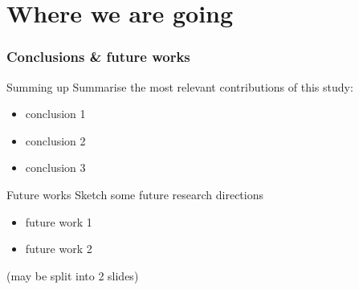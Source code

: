 \documentclass[presentation]{beamer}\mode<presentation>{\usetheme{blackAMSBolognaFC}}
\begin{document}
\section{Where we are going}

\begin{frame}%
\frametitle{Conclusions \& future works}

\begin{block}{Summing up}
    Summarise the most relevant contributions of this study:
    \begin{itemize}
        \item conclusion 1
        \item conclusion 2
        \item conclusion 3
    \end{itemize}
\end{block}

\begin{exampleblock}{Future works}
    Sketch some future research directions
    \begin{itemize}
        \item future work 1
        \item future work 2
    \end{itemize}
\end{exampleblock}

(may be split into 2 slides)

\end{frame}

\section*{}
\frame{\titlepage}
\end{document}
